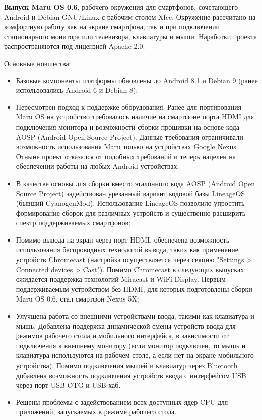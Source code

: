 \documentclass[a4paper, 14pt]{article}
\begin{document}
\par \textbf{Выпуск Maru OS 0.6}, рабочего окружения для смартфонов, сочетающего Android и Debian GNU/Linux с рабочим столом Xfce. Окружение рассчитано на комфортную работу как на экране смартфона, так и при подключении стационарного монитора или телевизора, клавиатуры и мыши. Наработки проекта распространяются под лицензией Apache 2.0.

\par Основные новшества:

\begin{itemize}
    \item Базовые компоненты платформы обновлены до Android 8.1 и Debian 9 (ранее использовались Android 6 и Debian 8);
    \item Пересмотрен подход к поддержке оборудования. Ранее для портирования Maru OS на устройство требовалось наличие на смартфоне порта HDMI для подключения монитора и возможности сборки прошивки на основе кода AOSP (Android Open Source Project). Данные требования ограничивали возможность использования Maru только на устройствах Google Nexus. Отныне проект отказался от подобных требований и теперь нацелен на обеспечении работы на любых Android-устройствах;
    \item В качестве основы для сборки вместо эталонного кода AOSP (Android Open Source Project) задействован урезанный вариант кодовой базы LineageOS (бывший CyanogenMod). Использование LineageOS позволило упростить формирование сборок для различных устройств и существенно расширить спектр поддерживаемых смартфонов;
    \item Помимо вывода на экран через порт HDMI, обеспечена возможность использования беспроводных технологий вывода, таких как применение устройств Chromecast (настройка осуществляется через секцию "Settings > Connected devices > Cast"). Помимо Chromecast в следующих выпусках ожидается поддержка технологий Miracast и WiFi Display. Первым поддерживаемым устройством без HDMI, для которых подготовлены сборки Maru OS 0.6, стал смартфон Nexus 5X;
    \item Улучшена работа со внешними устройствами ввода, такими как клавиатура и мышь. Добавлена поддержка динамической смены устройств ввода для режимов рабочего стола и мобильного интерфейса, в зависимости от подключения к внешнему монитору (если монитор подключен, то мышь и клавиатура используются на рабочем столе, а если нет на экране мобильного устройства). Помимо подключения мышей и клавиатур через Bluetooth добавлена возможность подключения устройств ввода с интерфейсом USB через порт USB-OTG и USB-хаб.
    \item Решены проблемы с задействованием всех доступных ядер CPU для приложений, запускаемых в режиме рабочего стола.
\end{itemize}
\end{document}
